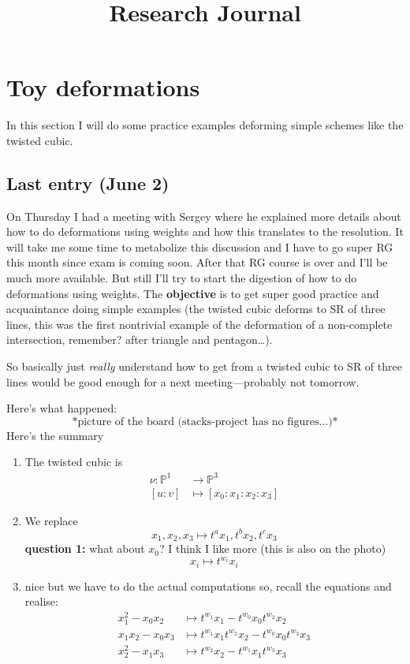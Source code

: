 



\title{Research Journal}
\maketitle

\label{section-phantom}

\tableofcontents

\section{Toy deformations}
\label{section-toy-deformations}

In this section I will do some practice examples deforming simple schemes like
the twisted cubic.

\subsection{Last entry (June 2)}
\label{subsection-june-2}

On Thursday I had a meeting with Sergey where he explained more details about how to do deformations using weights and how this translates to the resolution. It will take me some time to metabolize this discussion and I have to go super RG this month since exam is coming soon. After that RG course is over and I'll be much more available. But still I'll try to start the digestion of how to do deformations using weights. The \textbf{objective} is to get super good practice and acquaintance doing simple examples (the twisted cubic deforms to SR of three lines, this was the first nontrivial example of the deformation of a non-complete intersection, remember? after triangle and pentagon…).

So basically just \textit{really} understand how to get from a twisted cubic to SR of three lines would be good enough for a next meeting---probably not tomorrow.

Here's what happened:
$$
\text{*picture of the board (stacks-project has no figures…)*} 
$$
Here's the summary
\begin{enumerate}
\item The twisted cubic is
	\begin{align*}
		\nu: \mathbb{P}^1 &\longrightarrow \mathbb{P}^3 \\
		[u:v] &\longmapsto [x_0:x_1:x_2:x_3]
	\end{align*}
\item We replace
	\[x_1,x_2,x_3\longmapsto t^a x_1, t^bx_2, t^c x_3\]
\textbf{question 1:} what about \(x_0\)? I think I like more (this is also on the photo)
\[x_i \longmapsto t^{w_i}x_i\]
\item nice but we have to do the actual computations so, recall the equations and realise:
	\begin{align*}
	x_1^2-x_0x_2&\longmapsto t^{w_1}x_1-t^{w_0}x_0t^{w_2}x_2\\
	x_1x_2-x_0x_3&\longmapsto t^{w_1}x_1t^{w_2}x_2-t^{w_0}x_0t^{w_3}x_3\\
	x_2^2-x_1x_3 &\longmapsto t^{w_2}x_2-t^{w_1}x_1t^{w_3}x_3
	\end{align*}
\end{enumerate}


